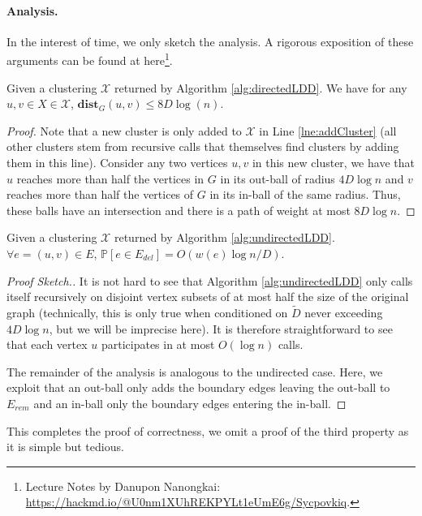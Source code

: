 \paragraph{Analysis.} In the interest of time, we only sketch the analysis. A rigorous exposition of these arguments can be found at here\footnote{Lecture Notes by Danupon Nanongkai: \url{https://hackmd.io/@U0nm1XUhREKPYLt1eUmE6g/Sycpovkiq}.}.

\begin{claim}
Given a clustering $\mathcal{X}$ returned by Algorithm \ref{alg:directedLDD}. We have for any $u,v \in X \in \mathcal{X}$, $\mathbf{dist}_{G}(u,v) \leq 8 D \log(n)$. 
\end{claim}
\begin{proof}
Note that a new cluster is only added to $\mathcal{X}$ in Line \ref{lne:addCluster} (all other clusters stem from recursive calls that themselves find clusters by adding them in this line). Consider any two vertices $u,v$ in this new cluster, we have that $u$ reaches more than half the vertices in $G$ in its out-ball of radius $4D \log n$ and $v$ reaches more than half the vertices of $G$ in its in-ball of the same radius. Thus, these balls have an intersection and there is a path of weight at most $8D \log n$. 
\end{proof}

\begin{claim}
Given a clustering $\mathcal{X}$ returned by Algorithm \ref{alg:undirectedLDD}. $\forall e = (u,v) \in E$, $\mathbb{P}[e \in E_{del}] = O(w(e) \log n / D)$.
\end{claim}
\begin{proof}[Proof Sketch.]
It is not hard to see that  Algorithm \ref{alg:undirectedLDD} only calls itself recursively on disjoint vertex subsets of at most half the size of the original graph (technically, this is only true when conditioned on $\tilde{D}$ never exceeding $4D \log n$, but we will be imprecise here). It is therefore straightforward to see that each vertex $u$ participates in at most $O(\log n)$ calls. 

The remainder of the analysis is analogous to the undirected case. Here, we exploit that an out-ball only adds the boundary edges leaving the out-ball to $E_{rem}$ and an in-ball only the boundary edges entering the in-ball. 
\end{proof}

This completes the proof of correctness, we omit a proof of the third property as it is simple but tedious.

